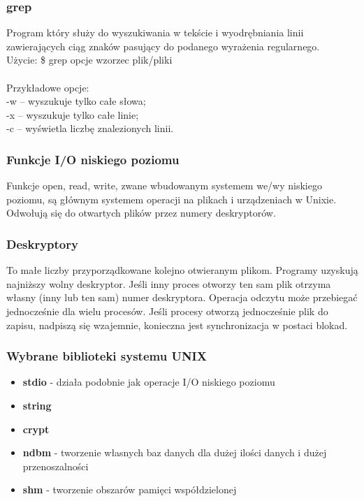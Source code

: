 \documentclass[a4paper,twoside]{report}
\begin{document}
\subsubsection{grep}

Program który służy do wyszukiwania w tekście i wyodrębniania linii zawierających ciąg znaków pasujący do podanego wyrażenia regularnego.\\
Użycie: \$ grep opcje wzorzec plik/pliki\\\\
Przykładowe opcje: \\
-w – wyszukuje tylko całe słowa;\\
-x – wyszukuje tylko całe linie;\\
-c –  wyświetla liczbę znalezionych linii.


\subsubsection{Funkcje I/O niskiego poziomu}
Funkcje open, read, write, zwane wbudowanym systemem we/wy niskiego poziomu, są głównym systemem operacji na plikach i urządzeniach w Unixie.
Odwołują się do otwartych plików przez numery deskryptorów.

\subsubsection{Deskryptory}
To małe liczby przyporządkowane kolejno otwieranym plikom. Programy uzyskują najniższy wolny deskryptor. Jeśli inny proces otworzy ten sam plik otrzyma własny (inny lub ten sam) numer deskryptora. Operacja odczytu może przebiegać jednocześnie dla wielu procesów. Jeśli procesy otworzą jednocześnie plik do zapisu, nadpiszą się wzajemnie, konieczna jest synchronizacja w postaci blokad. 

\subsubsection{Wybrane biblioteki systemu UNIX}
\begin{itemize}
	\item \textbf{stdio} - 	działa podobnie jak operacje I/O niskiego poziomu
	\item \textbf{string} 
	\item \textbf{crypt} 
	\item \textbf{ndbm} - tworzenie własnych baz danych dla dużej ilości danych i dużej przenoszalności
	\item \textbf{shm} - tworzenie obszarów pamięci współdzielonej
\end{itemize}
\end{document}
